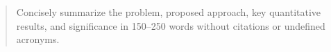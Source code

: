 \begin{abstract}
Concisely summarize the problem, proposed approach, key quantitative results, and significance in 150--250 words without citations or undefined acronyms.
\end{abstract}

